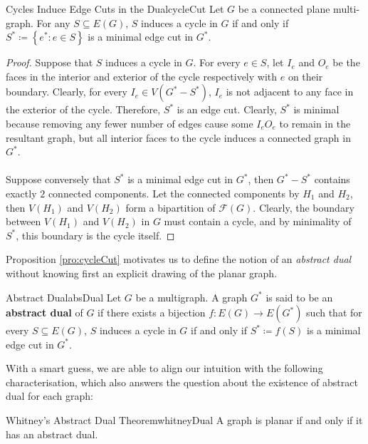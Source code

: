 \documentclass[math]{amznotes}
\theoremstyle{remark}
\newcommand{\0}{\mathbf{0}}
\newcommand{\1}{\mathbf{1}}
\begin{document}
\begin{probox}{Cycles Induce Edge Cuts in the Dual}{cycleCut}
    Let $G$ be a connected plane multi-graph. For any $S \subseteq E(G)$, $S$ induces a cycle in $G$ if and only if $S^* \coloneqq \left\{e^* \colon e \in S\right\}$ is a minimal edge cut in $G^*$.
    \tcblower
    \begin{proof}
        Suppose that $S$ induces a cycle in $G$. For every $e \in S$, let $I_e$ and $O_e$ be the faces in the interior and exterior of the cycle respectively with $e$ on their boundary. Clearly, for every $I_e \in V(G^* - S^*)$, $I_e$ is not adjacent to any face in the exterior of the cycle. Therefore, $S^*$ is an edge cut. Clearly, $S^*$ is minimal because removing any fewer number of edges cause some $I_eO_e$ to remain in the resultant graph, but all interior faces to the cycle induces a connected graph in $G^*$.
        \\\\
        Suppose conversely that $S^*$ is a minimal edge cut in $G^*$, then $G^* - S^*$ contains exactly $2$ connected components. Let the connected components by $H_1$ and $H_2$, then $V(H_1)$ and $V(H_2)$ form a bipartition of $\mathcal{F}(G)$. Clearly, the boundary between $V(H_1)$ and $V(H_2)$ in $G$ must contain a cycle, and by minimality of $S^*$, this boundary is the cycle itself. 
    \end{proof}
\end{probox}
Proposition \ref{pro:cycleCut} motivates us to define the notion of an \textit{abstract dual} without knowing first an explicit drawing of the planar graph.
\begin{dfnbox}{Abstract Dual}{absDual}
    Let $G$ be a multigraph. A graph $G^*$ is said to be an {\color{red} \textbf{abstract dual}} of $G$ if there exists a bijection $f \colon E(G) \to E(G^*)$ such that for every $S \subseteq E(G)$, $S$ induces a cycle in $G$ if and only if $S^* \coloneqq f(S)$ is a minimal edge cut in $G^*$.
\end{dfnbox}
With a smart guess, we are able to align our intuition with the following characterisation, which also answers the question about the existence of abstract dual for each graph:
\begin{thmbox}{Whitney's Abstract Dual Theorem}{whitneyDual}
    A graph is planar if and only if it has an abstract dual.
\end{thmbox}
\end{document}
